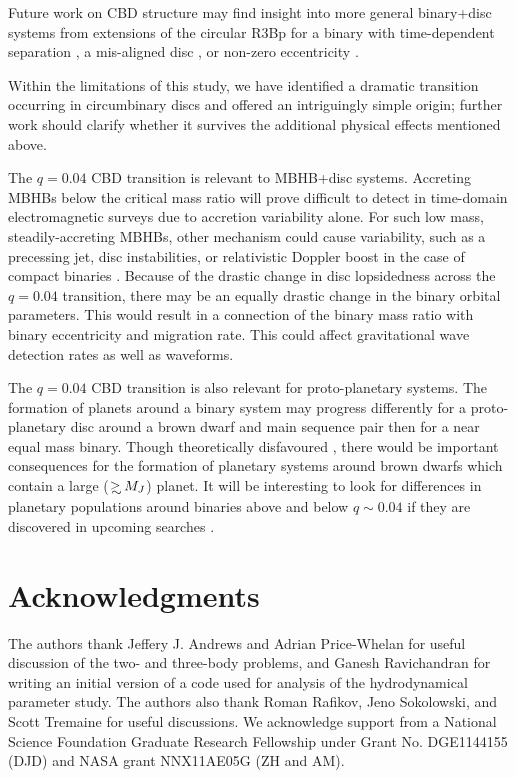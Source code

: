 Future work on CBD structure may find insight into more general
binary+disc systems from extensions of the circular R3Bp for a binary
with time-dependent separation \citep{SchnitL4L5:2010}, a mis-aligned
disc \citep{ErwinSparke:1999}, or non-zero eccentricity
\citep{PSA:2005}.

Within the limitations of this study, we have identified a dramatic
transition occurring in circumbinary discs and offered an intriguingly
simple origin; further work should clarify whether it survives the
additional physical effects mentioned above.

The $q=0.04$ CBD transition is relevant to MBHB+disc
systems. Accreting MBHBs below the critical mass ratio will prove
difficult to detect in time-domain electromagnetic surveys due to
accretion variability alone. For such low mass, steadily-accreting
MBHBs, other mechanism could cause variability, such as a precessing
jet, disc instabilities, or relativistic Doppler boost in the case of
compact binaries \citep{PG1302Nature:2015b}.  Because of the drastic
change in disc lopsidedness across the $q=0.04$ transition, there may
be an equally drastic change in the binary orbital parameters. This
would result in a connection of the binary mass ratio with binary
eccentricity and migration rate. This could affect gravitational wave
detection rates as well as waveforms.

The $q=0.04$ CBD transition is also relevant for proto-planetary
systems. The formation of planets around a binary system may progress
differently for a proto-planetary disc around a brown dwarf and main
sequence pair \citep[\textit{e.g},][]{q0p02MSBD:2014,
  StellMassRatDist:2015, 7StellarEMRs:2015} then for a near equal mass
binary. Though theoretically disfavoured \citep{PayneLodato:2007},
there would be important consequences for the formation of planetary
systems around brown dwarfs which contain a large ($\gsim M_J$)
planet. It will be interesting to look for differences in planetary
populations around binaries above and below $q\sim 0.04$ if they are
discovered in upcoming searches \citep[\textit{e.g.}][]{Triaud:2013,
  TESS:2014}.


\section*{Acknowledgments}
The authors thank Jeffery J. Andrews and Adrian Price-Whelan for
useful discussion of the two- and three-body problems, and Ganesh
Ravichandran for writing an initial version of a code used for
analysis of the hydrodynamical parameter study. The authors also thank
Roman Rafikov, Jeno Sokolowski, and Scott Tremaine for useful
discussions. We acknowledge support from a National Science Foundation
Graduate Research Fellowship under Grant No. DGE1144155 (DJD) and NASA
grant NNX11AE05G (ZH and AM).


